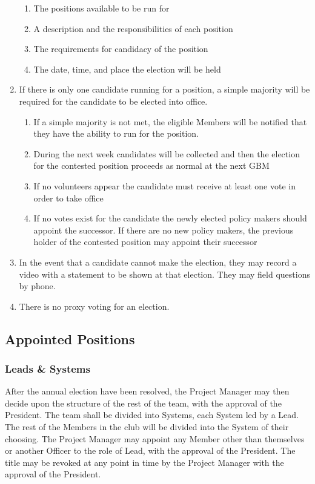\begin{enumerate}
    \begin{enumerate}
    \item The positions available to be run for
    \item A description and the responsibilities of each position
    \item The requirements for candidacy of the position
    \item The date, time, and place the election will be held
    \end{enumerate}
\item If there is only one candidate running for a position, a simple majority will be required for the candidate to be elected into office.
    \begin{enumerate}
    \item  If a simple majority is not met, the eligible Members will be notified that they have the ability to run for the position.
    \item During the next week candidates will be collected and then the election for the contested position proceeds as normal at the next GBM
    \item If no volunteers appear the candidate must receive at least one vote in order to take office
    \item If no votes exist for the candidate the newly elected policy makers should appoint the successor. If there are no new policy makers, the previous holder of the contested position may appoint their successor
    \end{enumerate}
\item In the event that a candidate cannot make the election, they may record a video with a statement to be shown at that election. They may field questions by phone.
\item There is no proxy voting for an election.
\end{enumerate}

\subsection{Appointed Positions}
\label{roles:appointed}

\subsubsection{Leads \& Systems}
\label{roles:appointed:leads}
After the annual election have been resolved, the Project Manager may then decide upon the structure of the rest of the team, with the approval of the President. The team shall be divided into Systems, each System led by a Lead. The rest of the Members in the club will be divided into the System of their choosing. The Project Manager may appoint any Member other than themselves or another Officer to the role of Lead, with the approval of the President. The title may be revoked at any point in time by the Project Manager with the approval of the President.

